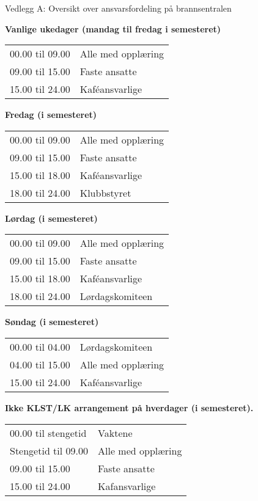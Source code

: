 \begin{instruks}{Vedlegg A: Oversikt over ansvarsfordeling på brannsentralen}{}{}
    
    
    \textbf{Vanlige ukedager (mandag til fredag i semesteret)}

    \begin{tabular}{ll}
        00.00 til 09.00 &    Alle med opplæring \\
        09.00 til 15.00 &    Faste ansatte\\
        15.00 til 24.00 &    Kaf\'eansvarlige 
    \end{tabular}

    
    \textbf{Fredag (i semesteret)}
    
    \begin{tabular}{ll}
        00.00 til 09.00 &Alle med opplæring \\
        09.00 til 15.00 &Faste ansatte\\
        15.00 til 18.00 &Kaf\'eansvarlige\\
        18.00 til 24.00 &Klubbstyret
    \end{tabular}

    
    \textbf{Lørdag (i semesteret)}
    
    
    \begin{tabular}{ll}
        00.00 til 09.00 &Alle med opplæring \\
        09.00 til 15.00 &Faste ansatte\\
        15.00 til 18.00 &Kaf\'eansvarlige\\
        18.00 til 24.00 & Lørdagskomiteen
    \end{tabular}

    
    \textbf{Søndag (i semesteret)}
    
    
    \begin{tabular}{ll}
        00.00 til 04.00 &Lørdagskomiteen\\
        04.00 til 15.00 & Alle med opplæring\\
        15.00 til 24.00 & Kaf\'eansvarlige
    \end{tabular}

    
    \textbf{Ikke KLST/LK arrangement på hverdager (i semesteret).}
    
    
    \begin{tabular}{ll}
        00.00 til stengetid &    Vaktene\\
        Stengetid til 09.00 &    Alle med opplæring\\
        09.00 til 15.00 &     Faste ansatte \\
        15.00 til 24.00 &     Kafansvarlige
    \end{tabular}


\end{instruks}
